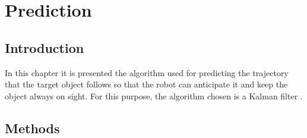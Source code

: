 
\chapter{Prediction} %
\label{chap:prediction}
\section{Introduction}
In this chapter it is presented the algorithm used for predicting the trajectory that the target object follows so that the robot can anticipate it and keep the object always on sight.
For this purpose, the algorithm chosen is a Kalman filter \cite{kalman}.

\section{Methods}


